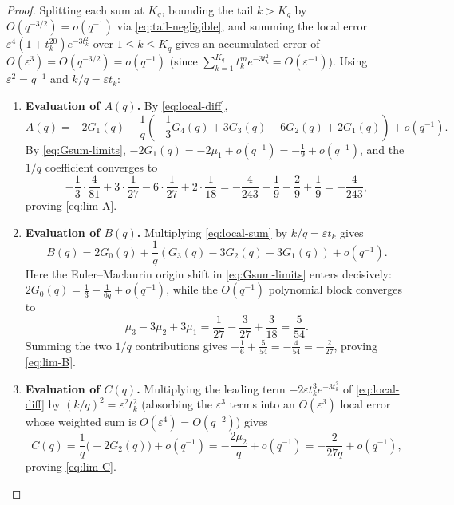 \documentclass[11pt,a4paper]{article}
\numberwithin{equation}{section}
\theoremstyle{plain}
\theoremstyle{definition}
\theoremstyle{remark}
\begin{document}
\begin{proof}
Splitting each sum at $K_q$, bounding the tail $k>K_q$ by $O(q^{-3/2})=o(q^{-1})$ via \eqref{eq:tail-negligible}, and summing the local error $\varepsilon^4(1+t_k^{20})e^{-3t_k^2}$ over $1\le k\le K_q$ gives an accumulated error of $O(\varepsilon^3)=O(q^{-3/2})=o(q^{-1})$ (since $\sum_{k=1}^{K_q} t_k^m e^{-3t_k^2}=O(\varepsilon^{-1})$). Using $\varepsilon^2=q^{-1}$ and $k/q = \varepsilon t_k$:

\begin{enumerate}[label=(\roman*)]
  \item \textbf{Evaluation of $A(q)$.} By \eqref{eq:local-diff},
  \[
    A(q) = -2G_1(q) + \frac{1}{q}\!\left(-\frac{1}{3}G_4(q) + 3G_3(q) - 6G_2(q) + 2G_1(q)\right) + o(q^{-1}).
  \]
  By \eqref{eq:Gsum-limits}, $-2G_1(q)=-2\mu_1+o(q^{-1})=-\frac{1}{9}+o(q^{-1})$, and the $1/q$ coefficient converges to
  \[
    -\frac{1}{3}\cdot\frac{4}{81} + 3\cdot\frac{1}{27} - 6\cdot\frac{1}{27} + 2\cdot\frac{1}{18}
    = -\frac{4}{243} + \frac{1}{9} - \frac{2}{9} + \frac{1}{9}
    = -\frac{4}{243},
  \]
  proving \eqref{eq:lim-A}.

  \item \textbf{Evaluation of $B(q)$.} Multiplying \eqref{eq:local-sum} by $k/q=\varepsilon t_k$ gives
  \[
    B(q) = 2G_0(q) + \frac{1}{q}\!\left(G_3(q) - 3G_2(q) + 3G_1(q)\right) + o(q^{-1}).
  \]
  Here the Euler--Maclaurin origin shift in \eqref{eq:Gsum-limits} enters decisively: $2G_0(q) = \frac{1}{3} - \frac{1}{6q} + o(q^{-1})$, while the $O(q^{-1})$ polynomial block converges to
  \[
    \mu_3 - 3\mu_2 + 3\mu_1 = \frac{1}{27} - \frac{3}{27} + \frac{3}{18} = \frac{5}{54}.
  \]
  Summing the two $1/q$ contributions gives $-\frac{1}{6} + \frac{5}{54} = -\frac{4}{54} = -\frac{2}{27}$, proving \eqref{eq:lim-B}.

  \item \textbf{Evaluation of $C(q)$.} Multiplying the leading term $-2\varepsilon t_k^3 e^{-3t_k^2}$ of \eqref{eq:local-diff} by $(k/q)^2 = \varepsilon^2 t_k^2$ (absorbing the $\varepsilon^3$ terms into an $O(\varepsilon^3)$ local error whose weighted sum is $O(\varepsilon^4)=O(q^{-2})$) gives
  \[
    C(q) = \frac{1}{q}\bigl(-2G_2(q)\bigr) + o(q^{-1})
         = -\frac{2\mu_2}{q} + o(q^{-1})
         = -\frac{2}{27q} + o(q^{-1}),
  \]
  proving \eqref{eq:lim-C}. \qedhere
\end{enumerate}
\end{proof}
\end{document}
